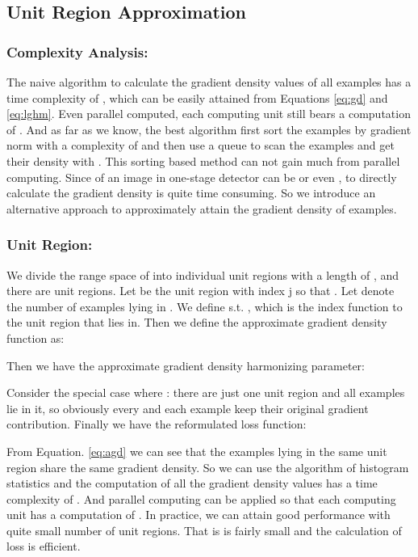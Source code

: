 \documentclass[letterpaper]{article} \usepackage{aaai19}  \usepackage{times}  \usepackage{helvet}  \usepackage{courier}  \usepackage{url}  \usepackage{graphicx}  \usepackage{amsmath,amssymb}
\begin{document}
\subsection{Unit Region Approximation}
\subsubsection{Complexity Analysis:} The naive algorithm to calculate the gradient density values of all examples has a time complexity of , which can be easily attained from Equations \ref{eq:gd} and \ref{eq:lghm}. Even parallel computed, each computing unit still bears a computation of . And as far as we know, the best algorithm first sort the examples by gradient norm with a complexity of  and then use a queue to scan the examples and get their density with . This sorting based method can not gain much from parallel computing. Since  of an image in one-stage detector can be  or even , to directly calculate the gradient density is quite time consuming. So we introduce an alternative approach to approximately attain the gradient density of examples.

\subsubsection{Unit Region:} We divide the range space of  into individual unit regions with a length of , and there are  unit regions. Let  be the unit region with index j so that . Let  denote the number of examples lying in . We define  s.t. , which is the index function to the unit region that  lies in. Then we define the approximate gradient density function as:

Then we have the approximate gradient density harmonizing parameter:

Consider the special case where : there are just one unit region and all examples lie in it, so obviously every  and each example keep their original gradient contribution.
Finally we have the reformulated loss function:


From Equation. \ref{eq:agd} we can see that the examples lying in the same unit region share the same gradient density. So we can use the algorithm of histogram statistics and the computation of all the gradient density values has a time complexity of . And parallel computing can be applied so that each computing unit has a computation of . In practice, we can attain good performance with quite small number of unit regions. That is  is fairly small and the calculation of loss is efficient.
\end{document}
